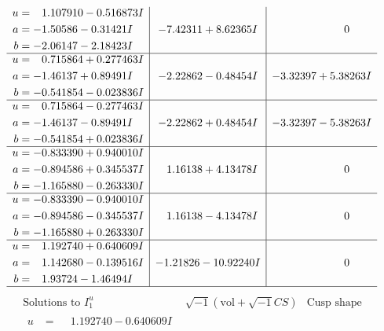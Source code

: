 \documentclass[1p]{elsarticle_modified}
\theoremstyle{definition}
\newcommand{\I}{\sqrt{-1}}
\begin{document}
$$\begin{array}{c|c|c}
\begin{aligned}
u &= \phantom{-}1.107910 - 0.516873 I \\
a &= -1.50586 - 0.31421 I \\
b &= -2.06147 - 2.18423 I\end{aligned}
 & -7.42311 + 8.62365 I & \phantom{-0.000000 } 0 \\ \hline\begin{aligned}
u &= \phantom{-}0.715864 + 0.277463 I \\
a &= -1.46137 + 0.89491 I \\
b &= -0.541854 - 0.023836 I\end{aligned}
 & -2.22862 - 0.48454 I & -3.32397 + 5.38263 I \\ \hline\begin{aligned}
u &= \phantom{-}0.715864 - 0.277463 I \\
a &= -1.46137 - 0.89491 I \\
b &= -0.541854 + 0.023836 I\end{aligned}
 & -2.22862 + 0.48454 I & -3.32397 - 5.38263 I \\ \hline\begin{aligned}
u &= -0.833390 + 0.940010 I \\
a &= -0.894586 + 0.345537 I \\
b &= -1.165880 - 0.263330 I\end{aligned}
 & \phantom{-}1.16138 + 4.13478 I & \phantom{-0.000000 } 0 \\ \hline\begin{aligned}
u &= -0.833390 - 0.940010 I \\
a &= -0.894586 - 0.345537 I \\
b &= -1.165880 + 0.263330 I\end{aligned}
 & \phantom{-}1.16138 - 4.13478 I & \phantom{-0.000000 } 0 \\ \hline\begin{aligned}
u &= \phantom{-}1.192740 + 0.640609 I \\
a &= \phantom{-}1.142680 - 0.139516 I \\
b &= \phantom{-}1.93724 - 1.46494 I\end{aligned}
 & -1.21826 - 10.92240 I & \phantom{-0.000000 } 0\\
 \hline 
 \end{array}$$\newpage$$\begin{array}{c|c|c}  
\text{Solutions to }I^u_{1}& \I (\text{vol} + \sqrt{-1}CS) & \text{Cusp shape}\\
 \hline 
\begin{aligned}
u &= \phantom{-}1.192740 - 0.640609 I \\

\end{aligned}
\end{array}$$
\end{document}
